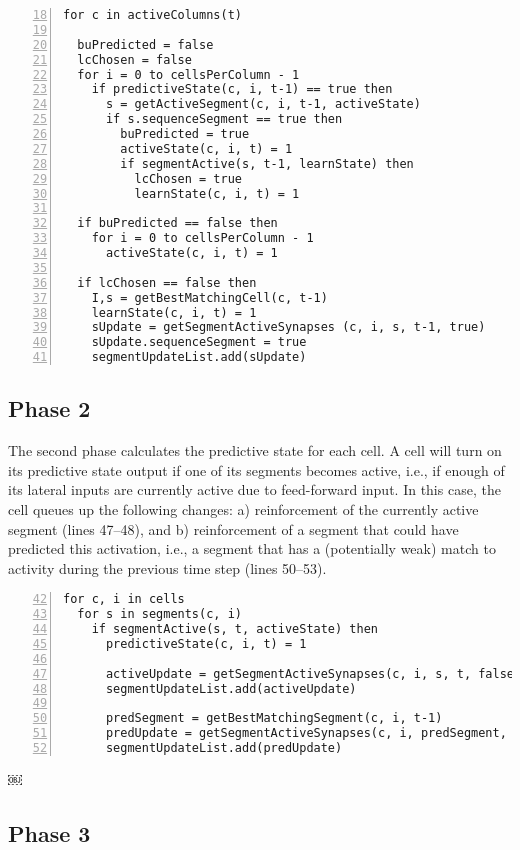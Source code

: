 \begin{lstlisting}[numbers=left,firstnumber=18]
for c in activeColumns(t)

  buPredicted = false
  lcChosen = false
  for i = 0 to cellsPerColumn - 1
    if predictiveState(c, i, t-1) == true then
      s = getActiveSegment(c, i, t-1, activeState)
      if s.sequenceSegment == true then
        buPredicted = true
        activeState(c, i, t) = 1
        if segmentActive(s, t-1, learnState) then
          lcChosen = true
          learnState(c, i, t) = 1

  if buPredicted == false then
    for i = 0 to cellsPerColumn - 1
      activeState(c, i, t) = 1

  if lcChosen == false then
    I,s = getBestMatchingCell(c, t-1)
    learnState(c, i, t) = 1
    sUpdate = getSegmentActiveSynapses (c, i, s, t-1, true)
    sUpdate.sequenceSegment = true
    segmentUpdateList.add(sUpdate)
\end{lstlisting}

\subsection*{Phase 2}

The second phase calculates the predictive state for each cell. A cell
will turn on its predictive state output if one of its segments
becomes active, i.e., if enough of its lateral inputs are currently
active due to feed-forward input. In this case, the cell queues up the
following changes: a) reinforcement of the currently active segment
(lines 47--48), and b) reinforcement of a segment that could have
predicted this activation, i.e., a segment that has a (potentially
weak) match to activity during the previous time step (lines 50--53).

\begin{lstlisting}[numbers=left,firstnumber=42]
for c, i in cells
  for s in segments(c, i)
    if segmentActive(s, t, activeState) then
      predictiveState(c, i, t) = 1

      activeUpdate = getSegmentActiveSynapses(c, i, s, t, false)
      segmentUpdateList.add(activeUpdate)

      predSegment = getBestMatchingSegment(c, i, t-1)
      predUpdate = getSegmentActiveSynapses(c, i, predSegment, t-1, true)
      segmentUpdateList.add(predUpdate)
\end{lstlisting}
￼
\subsection*{Phase 3}

